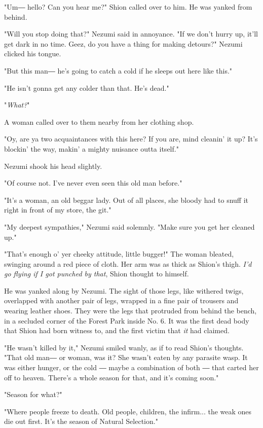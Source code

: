 "Um― hello? Can you hear me?" Shion called over to him. He was yanked
from behind.

"Will you stop doing that?" Nezumi said in annoyance. "If we don't hurry
up, it'll get dark in no time. Geez, do you have a thing for making
detours?" Nezumi clicked his tongue.

"But this man― he's going to catch a cold if he sleeps out here like
this."

"He isn't gonna get any colder than that. He's dead."

"\emph{What?}"

A woman called over to them nearby from her clothing shop.

"Oy, are ya two acquaintances with this here? If you are, mind cleanin'
it up? It's blockin' the way, makin' a mighty nuisance outta itself."

Nezumi shook his head slightly.

"Of course not. I've never even seen this old man before."

"It's a woman, an old beggar lady. Out of all places, she bloody had to
snuff it right in front of my store, the git."

"My deepest sympathies," Nezumi said solemnly. "Make sure you get her
cleaned up."

"That's enough o' yer cheeky attitude, little bugger!" The woman
bleated, swinging around a red piece of cloth. Her arm was as thick as
Shion's thigh. \emph{I'd go flying if I got punched by that}, Shion thought to
himself.

He was yanked along by Nezumi. The sight of those legs, like withered
twigs, overlapped with another pair of legs, wrapped in a fine pair of
trousers and wearing leather shoes. They were the legs that protruded
from behind the bench, in a secluded corner of the Forest Park inside
No. 6. It was the first dead body that Shion had born witness to, and
the first victim that \emph{it} had claimed.

"He wasn't killed by it," Nezumi smiled wanly, as if to read Shion's
thoughts. "That old man― or woman, was it? She wasn't eaten by any
parasite wasp. It was either hunger, or the cold ― maybe a combination
of both ― that carted her off to heaven. There's a whole season for
that, and it's coming soon."

"Season for what?"

"Where people freeze to death. Old people, children, the infirm... the
weak ones die out first. It's the season of Natural Selection."

